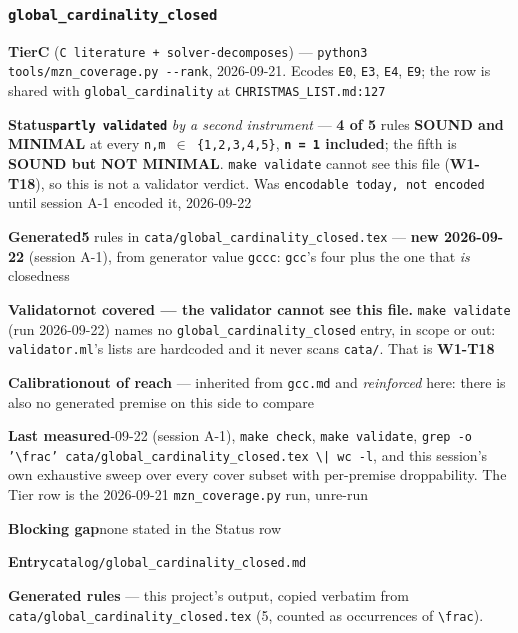 \documentclass[10pt,a4paper]{article}
\newcommand{\entryfield}[2]{{\raggedright\textbf{#1}\quad #2\par}}
\begin{document}
\subsubsection*{\texttt{global\_\allowbreak{}cardinality\_\allowbreak{}closed}}
\label{entry:global-cardinality-closed}
\entryfield{Tier}{\textbf{C} (\texttt{C literature + solver-\allowbreak{}decomposes}) --- \texttt{python3 tools/\allowbreak{}mzn\_\allowbreak{}coverage.\allowbreak{}py -\allowbreak{}-\allowbreak{}rank}, 2026-09-21. Ecodes \texttt{E0}, \texttt{E3}, \texttt{E4}, \texttt{E9}; the row is shared with \texttt{global\_cardinality} at \texttt{CHRISTMAS\_LIST.md:127}}
\entryfield{Status}{\textbf{\texttt{partly validated}} \emph{by a second instrument} --- \textbf{4 of 5} rules \textbf{SOUND and MINIMAL} at every \texttt{n,m $\in$ \{1,2,3,4,5\}}, \textbf{\texttt{n = 1} included}; the fifth is \textbf{SOUND but NOT MINIMAL}. \texttt{make validate} cannot see this file (\textbf{W1-T18}), so this is not a validator verdict. Was \texttt{encodable today, not encoded} until session A-1 encoded it, 2026-09-22}
\entryfield{Generated}{\textbf{5} rules in \texttt{cata/\allowbreak{}global\_\allowbreak{}cardinality\_\allowbreak{}closed.\allowbreak{}tex} --- \textbf{new 2026-09-22} (session A-1), from generator value \texttt{gccc}: \texttt{gcc}'s four plus the one that \emph{is} closedness}
\entryfield{Validator}{\textbf{not covered --- the validator cannot see this file.} \texttt{make validate} (run 2026-09-22) names no \texttt{global\_\allowbreak{}cardinality\_\allowbreak{}closed} entry, in scope or out: \texttt{validator.ml}'s lists are hardcoded and it never scans \texttt{cata/}. That is \textbf{W1-T18}}
\entryfield{Calibration}{\textbf{out of reach} --- inherited from \texttt{gcc.md} and \emph{reinforced} here: there is also no generated premise on this side to compare}
\entryfield{Last measured}{2026-09-22 (session A-1), \texttt{make check}, \texttt{make validate}, \texttt{grep -\allowbreak{}o '\textbackslash{}frac' cata/\allowbreak{}global\_\allowbreak{}cardinality\_\allowbreak{}closed.\allowbreak{}tex \textbackslash{}| wc -\allowbreak{}l}, and this session's own exhaustive sweep over every cover subset with per-premise droppability. The Tier row is the 2026-09-21 \texttt{mzn\_coverage.py} run, unre-run}
\entryfield{Blocking gap}{none stated in the Status row}
\entryfield{Entry}{\texttt{catalog/global\_cardinality\_closed.md}}

\textbf{Generated rules} --- this project's output, copied verbatim from \texttt{cata/global\_cardinality\_closed.tex} (5, counted as occurrences of \texttt{\textbackslash{}frac}).\par
\end{document}
